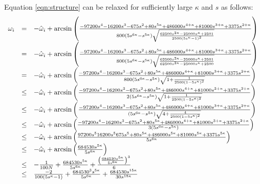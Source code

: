 Equation \ref{eqn:structure} can be relaxed for sufficiently large $\kappa$ and $s$ as follows:
 \begin{equation}\label{eqn:relaxedStructure}
 \begin{array}{rcl}
 \omega_i &=& -\hat{\omega}_i + \arcsin \left(  \frac{-97200s^4
-16200s^3
-675s^2+
80s^{5\kappa}+
486000s^{4+\kappa}+
81000s^{3+\kappa}+
3375s^{2+\kappa}}{800\left(5  s^{6  \kappa} - s^{5  \kappa}\right)
			\sqrt{
				\frac{62500 s^{2\kappa} - 25000 s^\kappa + 2501}{2500\left( 5s^\kappa - 1 \right)^2}
			 }
 }
 \right)\\
 &=& -\hat{\omega}_i + \arcsin \left(  \frac{-97200s^4
-16200s^3
-675s^2+
80s^{5\kappa}+
486000s^{4+\kappa}+
81000s^{3+\kappa}+
3375s^{2+\kappa}}{800\left(5  s^{6  \kappa} - s^{5  \kappa}\right)
			\sqrt{
				\frac{62500 s^{2\kappa} - 25000 s^\kappa + 2501}{62500 s^{2\kappa}-25000 s^\kappa +2500}
			 }
 }
 \right)\\
 &=& -\hat{\omega}_i + \arcsin \left(  \frac{-97200s^4
-16200s^3
-675s^2+
80s^{5\kappa}+
486000s^{4+\kappa}+
81000s^{3+\kappa}+
3375s^{2+\kappa}}{800\left(5  s^{6  \kappa} - s^{5  \kappa}\right)
			\sqrt{
				1+ \frac{1}{2500 \left( 1-5s^\kappa \right)^2}
			 }
 }
 \right)\\
 &\leq& -\hat{\omega}_i + \arcsin \left(  \frac{-97200s^4
-16200s^3
-675s^2+
80s^{5\kappa}+
486000s^{4+\kappa}+
81000s^{3+\kappa}+
3375s^{2+\kappa}}{2\left(5  s^{6  \kappa} - s^{5  \kappa}\right)
			\sqrt{
				1+ \frac{1}{2500 \left( 1-5s^\kappa \right)^2}
			 }
 }
 \right)\\
 &\leq& -\hat{\omega}_i + \arcsin \left(  \frac{-97200s^4
-16200s^3
-675s^2+
80s^{5\kappa}+
486000s^{4+\kappa}+
81000s^{3+\kappa}+
3375s^{2+\kappa}}{\left(5  s^{6  \kappa} - s^{5  \kappa}\right)
			\sqrt{
				4+ \frac{4}{2500 \left( 1-5s^\kappa \right)^2}
			 }
 }
 \right)\\
 &\leq& -\hat{\omega}_i + \arcsin \left(  \frac{-97200s^4
-16200s^3
-675s^2+
80s^{5\kappa}+
486000s^{4+\kappa}+
81000s^{3+\kappa}+
3375s^{2+\kappa}}{3\left(  5  s^{6 \kappa} - s^{5 \kappa}  \right) } 
 \right)\\
 &\leq& -\hat{\omega}_i + \arcsin \left(  \frac{
97200s^5
16200s^5
675s^5+
80s^{5\kappa}+
486000s^{5\kappa}+
81000s^{5\kappa}+
3375s^{5\kappa}}{ 5  s^{6 \kappa} } 
 \right)\\
 &\leq& -\hat{\omega}_i + \arcsin \left(  \frac{684530s^{5\kappa}}{ 5  s^{6 \kappa} } 
 \right)\\
&\leq& -\frac{1}{100N} + \frac{684530s^{5\kappa}}{ 5  s^{6 \kappa} } + \frac{\left( \frac{684530s^{5\kappa}}{5  s^{6 \kappa}} \right)^3}{6}\\
&\leq& \frac{-2}{100 \left( 5 s^\kappa - 1 \right)} + \frac{684530^3s^{5\kappa}}{ 5  s^{6 \kappa}} + \frac{684530s^{15\kappa}}{ 30  s^{18 \kappa}}
\end{array}
\end{equation}

